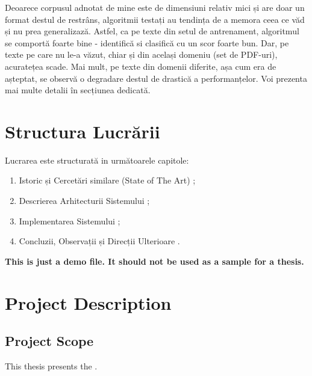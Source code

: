 Deoarece corpusul adnotat de mine este de dimensiuni relativ mici și are doar un format destul de restrâns, algoritmii testați au tendința de a memora ceea ce văd și nu prea generalizază. Astfel, ca pe texte din setul de antrenament, algoritmul se comportă foarte bine - identifică si clasifică cu un scor foarte bun. Dar, pe texte pe care nu le-a văzut, chiar și din același domeniu (set de PDF-uri), acuratețea scade. Mai mult, pe texte din domenii diferite, așa cum era de așteptat, se observă o degradare destul de drastică a performanțelor. Voi prezenta mai multe detalii în secțiunea dedicată.

\section{Structura Lucrării}

Lucrarea este structurată in următoarele capitole:

\begin{enumerate}

\item Istoric și Cercetări similare (State of The Art)  ;
\item Descrierea Arhitecturii Sistemului ;
\item Implementarea Sistemului ;
\item Concluzii, Observații și Direcții Ulterioare .

\end{enumerate}


\textbf{This is just a demo file. It should not be used as a sample for a thesis.}\\

\section{Project Description}
\label{sec:proj}

\subsection{Project Scope}
\label{sub-sec:proj-scope}

This thesis presents the \textbf{\project}.

